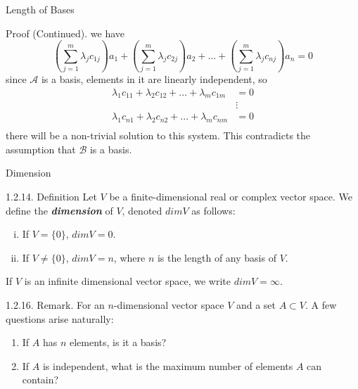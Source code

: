 \documentclass[hyperref={pdfpagelabels=true}]{beamer}
\newcommand{\highlightg}[1]{\textcolor[rgb]{0.1,0.5,0.3}{\emph{\textbf{#1}}}}
\newcommand{\<}{\langle}
\renewcommand{\>}{\rangle}
\begin{document}
\begin{frame}{Length of Bases}
    \begin{block}{Proof (Continued).}
        we have
        \[(\sum_{j = 1}^{m}\lambda_{j}c_{1j})a_{1}+(\sum_{j = 1}^{m}\lambda_{j}c_{2j})a_{2}+...+(\sum_{j = 1}^{m}\lambda_{j}c_{nj})a_{n} = 0\]
        since $\mathcal{A}$ is a basis, elements in it are linearly independent, so 
        \[
            \begin{aligned}
                \lambda_{1}c_{11}+\lambda_{2}c_{12}+...+\lambda_{m}c_{1m} &= 0 \\
                &\vdots \\
                \lambda_{1}c_{n1}+\lambda_{2}c_{n2}+...+\lambda_{m}c_{nm} &= 0 \\
            \end{aligned} 
        \]
        there will be a non-trivial solution to this system. This contradicts the assumption that $\mathcal{B}$ is a basis.
    \end{block} 
\end{frame}
\begin{frame}{Dimension}
    \begin{block}{1.2.14. Definition}
        Let $V$ be a finite-dimensional real or complex vector space. We define the \highlightg{dimension} of $V$, denoted $dim V$ as follows:
        \begin{enumerate}[(i)]
            \item If $V = \{0\}$, $dim V = 0.$
            \item If $V \neq \{0\}$, $dim V = n$, where $n$ is the length of any basis of $V$.
        \end{enumerate}
        If $V$ is an infinite dimensional vector space, we write $dim V = \infty$.
    \end{block}
    \begin{block}{1.2.16. Remark.}
        For an $n$-dimensional vector space $V$ and a set $A \subset V$. A few questions arise naturally:
        \begin{enumerate}
            \item If $A$ has $n$ elements, is it a basis?
            \item If $A$ is independent, what is the maximum number of elements $A$ can contain?
        \end{enumerate}
    \end{block}
\end{frame}
\end{document}
